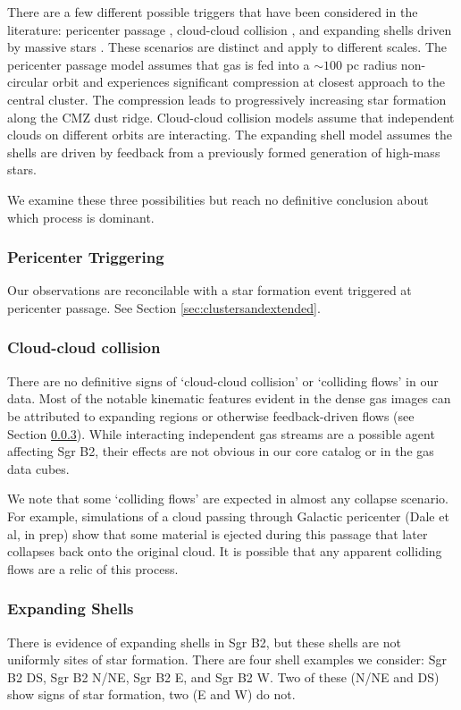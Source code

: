 \documentclass[twocolumn]{aastex61}
\begin{document}
There are a few different possible triggers that have been considered in the
literature: pericenter passage \citep{Kruijssen2015a}, cloud-cloud collision
\citep{Hasegawa1994a,Mehringer1997a,Sato2000a}, and expanding shells driven by
massive stars \citep{Martin-Pintado1999a}.  These scenarios are distinct and
apply to different scales.  The pericenter passage model assumes that gas is
fed into a $\sim100$ pc radius non-circular orbit and experiences significant
compression at closest approach to the central cluster.  The compression leads
to progressively increasing star formation along the CMZ dust ridge.
Cloud-cloud collision models assume that independent clouds on different orbits
are interacting.  The expanding shell model assumes the shells are driven by
feedback from a previously formed generation of high-mass stars.

We examine these three possibilities but reach no definitive conclusion about
which process is dominant.

\subsubsection{Pericenter Triggering}
Our observations are reconcilable with a star formation event triggered
at pericenter passage.  See Section \ref{sec:clustersandextended}.

\subsubsection{Cloud-cloud collision}
There are no definitive signs of `cloud-cloud collision' or `colliding flows'
in our data.  Most of the notable kinematic features evident in the dense gas
images can be attributed to expanding \hii regions or otherwise feedback-driven
flows (see Section \ref{sec:expandingshells}).  While interacting independent
gas streams are a possible agent affecting Sgr B2, their effects are not
obvious in our core catalog or in the gas data cubes.

We note that some `colliding flows' are expected in almost any collapse
scenario.  For example, simulations of a cloud passing through Galactic
pericenter (Dale et al, in prep) show that some material is ejected during this
passage that later collapses back onto the original cloud.  It is possible that
any apparent colliding flows are a relic of this process.

\subsubsection{Expanding Shells}
\label{sec:expandingshells}
There is evidence of expanding shells in Sgr B2, but 
these shells are not uniformly sites of star formation.
There are four shell examples we consider: Sgr B2 DS, Sgr B2 N/NE,
Sgr B2 E, and Sgr B2 W.  Two of these (N/NE and DS) show signs
of star formation, two (E and W) do not.
\end{document}
